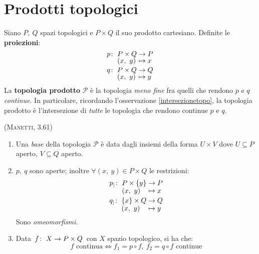 \section{Prodotti topologici}
\begin{define}
	Siano $P,\ Q$ spazi topologici e $P\times Q$ il suo prodotto cartesiano. Definite le \textbf{proiezioni}:
	\begin{gather}
		\funztot{p}{P\times Q}{P}{\left(x,\ y\right)}{x}\\
		\funztot{q}{P\times Q}{Q}{\left(x,\ y\right)}{y}
	\end{gather}
	La \textbf{topologia prodotto} $\mathcal{P}$ è la topologia \textit{meno fine} fra quelli che rendono $p$ e $q$ \textit{continue}. In particolare, ricordando l'osservazione \ref{intersezionetopo}, la topologia prodotto è l'intersezione di \textit{tutte} le topologia che rendono continue $p$ e $q$.
\end{define}
\begin{theorema}\textsc{(Manetti, 3.61)}\label{topprodotto}
	\begin{enumerate}
		\item Una \textit{base} della topologia $\mathcal{P}$ è data dagli insiemi della forma $U\times V$ dove $U\subseteq P$ aperto, $V\subseteq Q$ aperto.
		\item $p,\ q$ sono aperte; inoltre $\forall \left(x,\ y\right)\in P\times Q$ le restrizioni:
		\begin{gather}
			\funztot{p_{\mid}}{P\times \left\{y\right\}}{P}{\left(x,\ y\right)}{x}\\
			\funztot{q_{\mid}}{\left\{x\right\}\times Q}{Q}{\left(x,\ y\right)}{y}
		\end{gather}
		Sono \textit{omeomorfismi}.\\
		\item Data $\funz{f}{X}{P\times Q}$ con $X$ spazio topologico, si ha che:
		\begin{equation}
			f\text{ continua}\iff f_1=p\circ f,\ f_2=q\circ f\text{ continue}
		\end{equation}
	\end{enumerate}
	\vspace{-8mm}
\end{theorema}
